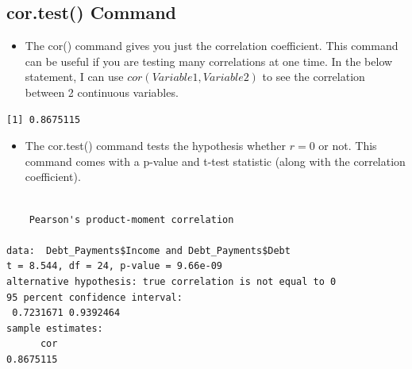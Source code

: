 \documentclass[
  letterpaper,
  DIV=11,
  numbers=noendperiod]{scrreprt}
\newenvironment{Shaded}{\begin{snugshade}}{\end{snugshade}}
\newcommand{\FunctionTok}[1]{\textcolor[rgb]{0.28,0.35,0.67}{#1}}
\newcommand{\NormalTok}[1]{\textcolor[rgb]{0.00,0.23,0.31}{#1}}
\newcommand{\SpecialCharTok}[1]{\textcolor[rgb]{0.37,0.37,0.37}{#1}}
\providecommand{\tightlist}{%
  \setlength{\itemsep}{0pt}\setlength{\parskip}{0pt}}\usepackage{longtable,booktabs,array}
\begin{document}
\subsection{cor.test() Command}\label{cor.test-command}

\begin{itemize}
\tightlist
\item
  The cor() command gives you just the correlation coefficient. This
  command can be useful if you are testing many correlations at one
  time. In the below statement, I can use \(cor(Variable1, Variable2)\)
  to see the correlation between 2 continuous variables.
\end{itemize}

\begin{Shaded}
\end{Shaded}

\begin{verbatim}
[1] 0.8675115
\end{verbatim}

\begin{itemize}
\tightlist
\item
  The cor.test() command tests the hypothesis whether \(r=0\) or not.
  This command comes with a p-value and t-test statistic (along with the
  correlation coefficient).
\end{itemize}

\begin{Shaded}
\end{Shaded}

\begin{verbatim}

    Pearson's product-moment correlation

data:  Debt_Payments$Income and Debt_Payments$Debt
t = 8.544, df = 24, p-value = 9.66e-09
alternative hypothesis: true correlation is not equal to 0
95 percent confidence interval:
 0.7231671 0.9392464
sample estimates:
      cor 
0.8675115 
\end{verbatim}
\end{document}
